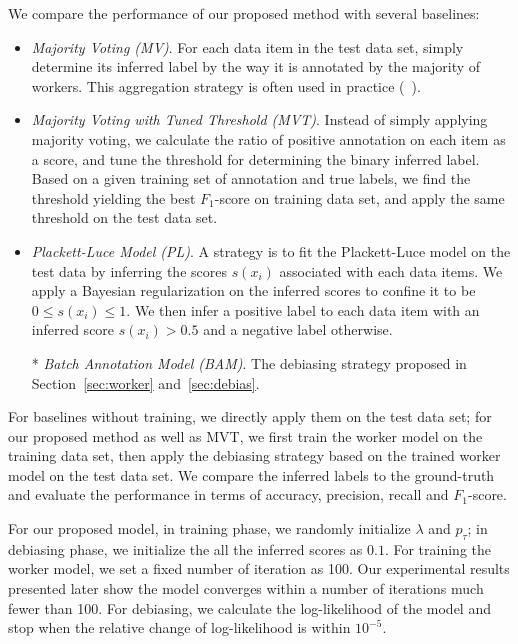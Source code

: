 We compare the performance of our proposed method with several baselines:
\begin{itemize}
  \item \emph{Majority Voting (MV)}.
        For each data item in the test data set, 
        simply determine its inferred label by the way it is annotated by the majority of workers.  
        This aggregation strategy is often used in practice (\eg~\cite{sheng:kdd2008}).  %
  \item \emph{Majority Voting with Tuned Threshold (MVT)}.
        Instead of simply applying majority voting, 
        we calculate the ratio of positive annotation on each item as a score, 
        and tune the threshold for determining the binary inferred label.  
        Based on a given training set of annotation and true labels, 
        we find the threshold yielding the best $F_1$-score on training data set, 
        and apply the same threshold on the test data set.  
  \item \emph{Plackett-Luce Model (PL)}.  
        A strategy is to fit the Plackett-Luce model on the test data by inferring the scores $s(x_i)$ associated with each data items.  
        We apply a Bayesian regularization on the inferred scores to confine it to be $0 \leq s(x_i) \leq 1$.  
        We then infer a positive label to each data item with an inferred score $s(x_i) > 0.5$ and a negative label otherwise.  
  \item[*] \emph{Batch Annotation Model (BAM)}.  
        The debiasing strategy proposed in Section~\ref{sec:worker} and~\ref{sec:debias}.
\end{itemize}

For baselines without training, we directly apply them on the test data set; 
for our proposed method as well as MVT, we first train the worker model on the training data set, 
then apply the debiasing strategy based on the trained worker model on the test data set.  
We compare the inferred labels to the ground-truth and evaluate the performance in terms of accuracy, precision, recall and $F_1$-score.  

For our proposed model, 
in training phase, we randomly initialize $\lambda$ and $p_{\tau}$;
in debiasing phase, we initialize the all the inferred scores as $0.1$. 
For training the worker model, we set a fixed number of iteration as 100.  
Our experimental results presented later show the model converges within 
a number of iterations much fewer than 100.  
For debiasing, we calculate the log-likelihood of the model and stop when the relative change of log-likelihood is within $10^{-5}$.  


